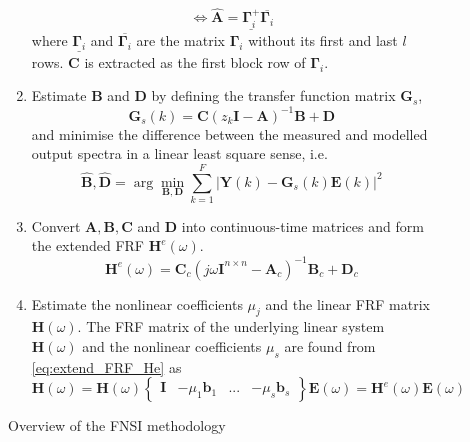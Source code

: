 \begin{figure}[!ht]
\begin{mdframed}
\begin{enumerate}
\begin{equation*}
        \iff
        \hat {\bm A} = \underline{\bm \Gamma^+_i} \overline{\bm \Gamma_i}
      \end{equation*}
      where $\underline{\bm \Gamma_i}$ and $\overline{\bm \Gamma_i}$ are the
      matrix $\bm \Gamma_i$ without its first and last $l$ rows.
      $\bm C$ is extracted as the first block row of $\bm \Gamma_i$.
    \item Estimate $\bm B$ and $\bm D$ by defining the transfer function matrix
      $\bm G_s$,
      \begin{equation*}
        \bm G_s(k) = \bm C(z_k \bm I - \bm A)^{-1} \bm B + \bm D
      \end{equation*}
      and minimise the difference between the measured and modelled output
      spectra in a linear least square sense, i.e.
      \begin{equation*}
        \hat {\bm B}, \hat {\bm D} = \arg \min_{\bm B, \bm D} \sum_{k=1}^F |\bm Y(k) - \bm G_s(k) \bm E(k)|^2
      \end{equation*}
    \item Convert $\bm A, \bm B, \bm C$ and $\bm D$ into continuous-time
      matrices and form the extended FRF $\bm H^e(\omega)$.
      \begin{equation}
        \label{eq:extend_FRF_He}
        \bm H^e(\omega) = \bm C_c \left(j \omega \bm I^{n \times n} - \bm A_c \right)^{-1} \bm B_c + \bm D_c
      \end{equation}
    \item Estimate the nonlinear coefficients $\mu_j$ and the linear FRF matrix
      $\bm H(\omega)$.
      The FRF matrix of the underlying linear system $\bm H(\omega)$ and the
      nonlinear coefficients $\mu_s$ are found from \eqref{eq:extend_FRF_He} as
      \begin{equation}
        \label{eq:FRE_H}
        \bm H(\omega) = \bm H(\omega)
        \begin{Bmatrix}
          \bm I & -\mu_1\bm b_1 & ... & -\mu_s \bm b_s
        \end{Bmatrix}
        \bm E (\omega)
        =
        \bm H^e(\omega) \bm E(\omega)
      \end{equation}
    \end{enumerate}
  \end{mdframed}
  \caption{Overview of the FNSI methodology}
  \label{fig:fnsi_methodolgoy}
\end{figure}

